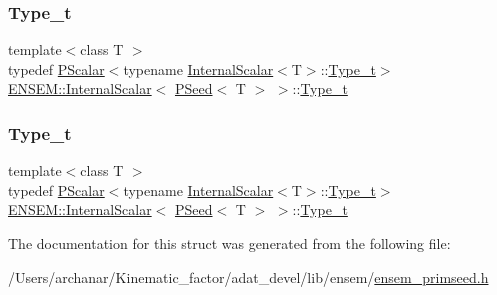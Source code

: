 \subsubsection{\texorpdfstring{Type\_t}{Type\_t}\hspace{0.1cm}{\footnotesize\ttfamily [1/2]}}
{\footnotesize\ttfamily template$<$class T $>$ \\
typedef \mbox{\hyperlink{classENSEM_1_1PScalar}{P\+Scalar}}$<$typename \mbox{\hyperlink{structENSEM_1_1InternalScalar}{Internal\+Scalar}}$<$T$>$\+::\mbox{\hyperlink{structENSEM_1_1InternalScalar_3_01PSeed_3_01T_01_4_01_4_af1fc242826d3ea17d7b76fd281a82eba}{Type\+\_\+t}}$>$ \mbox{\hyperlink{structENSEM_1_1InternalScalar}{E\+N\+S\+E\+M\+::\+Internal\+Scalar}}$<$ \mbox{\hyperlink{classENSEM_1_1PSeed}{P\+Seed}}$<$ T $>$ $>$\+::\mbox{\hyperlink{structENSEM_1_1InternalScalar_3_01PSeed_3_01T_01_4_01_4_af1fc242826d3ea17d7b76fd281a82eba}{Type\+\_\+t}}}

\mbox{\label{structENSEM_1_1InternalScalar_3_01PSeed_3_01T_01_4_01_4_af1fc242826d3ea17d7b76fd281a82eba}} 
\subsubsection{\texorpdfstring{Type\_t}{Type\_t}\hspace{0.1cm}{\footnotesize\ttfamily [2/2]}}
{\footnotesize\ttfamily template$<$class T $>$ \\
typedef \mbox{\hyperlink{classENSEM_1_1PScalar}{P\+Scalar}}$<$typename \mbox{\hyperlink{structENSEM_1_1InternalScalar}{Internal\+Scalar}}$<$T$>$\+::\mbox{\hyperlink{structENSEM_1_1InternalScalar_3_01PSeed_3_01T_01_4_01_4_af1fc242826d3ea17d7b76fd281a82eba}{Type\+\_\+t}}$>$ \mbox{\hyperlink{structENSEM_1_1InternalScalar}{E\+N\+S\+E\+M\+::\+Internal\+Scalar}}$<$ \mbox{\hyperlink{classENSEM_1_1PSeed}{P\+Seed}}$<$ T $>$ $>$\+::\mbox{\hyperlink{structENSEM_1_1InternalScalar_3_01PSeed_3_01T_01_4_01_4_af1fc242826d3ea17d7b76fd281a82eba}{Type\+\_\+t}}}



The documentation for this struct was generated from the following file\+:\begin{DoxyCompactItemize}
\item 
/\+Users/archanar/\+Kinematic\+\_\+factor/adat\+\_\+devel/lib/ensem/\mbox{\hyperlink{lib_2ensem_2ensem__primseed_8h}{ensem\+\_\+primseed.\+h}}\end{DoxyCompactItemize}
